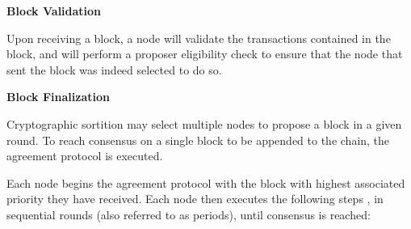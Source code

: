 \vspace{0.25cm}

\textbf{Block Validation}

Upon receiving a block, a node will validate the transactions contained in the block, and will perform a proposer eligibility check to ensure that the node that sent the block was indeed selected to do so.

\vspace{0.25cm}

\textbf{Block Finalization}

Cryptographic sortition may select multiple nodes to propose a block in a given round. To reach consensus on a single block to be appended to the chain, the agreement protocol is executed.

Each node begins the agreement protocol with the block with highest associated priority they have received. Each node then executes the following steps \cite{algorand_agreement}, in sequential rounds (also referred to as periods), until consensus is reached:

